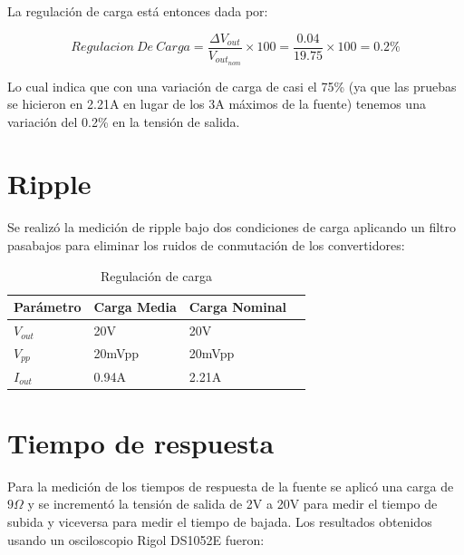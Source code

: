 \documentclass[12pt]{report}
\begin{document}
La regulación de carga está entonces dada por:

\begin{equation}
	Regulacion \ De \ Carga = \frac{\Delta V_{out}}{V_{out_{nom}}} \times 100 = \frac{0.04}{19.75} \times 100 = 0.2\%
\end{equation}

Lo cual indica que con una variación de carga de casi el 75\% (ya que las pruebas se hicieron en 2.21A en lugar de los 3A máximos de la fuente) tenemos una variación del 0.2\% en la tensión de salida.

\section{Ripple}

Se realizó la medición de ripple bajo dos condiciones de carga aplicando un filtro pasabajos para eliminar los ruidos de conmutación de los convertidores:

\begin{table}[H]
	\centering
	\begin{tabular}{M{2cm}M{3cm}M{3cm}M{3cm}} \toprule
		Parámetro & Carga Media & Carga Nominal \\
		\midrule
		$V_{out}$ & 20V & 20V \\
		$V_{pp}$ & 20mVpp & 20mVpp \\
		$I_{out}$ & 0.94A & 2.21A \\
		\bottomrule
	\end{tabular}
	\caption{Regulación de carga}
\end{table}

\section{Tiempo de respuesta}

Para la medición de los tiempos de respuesta de la fuente se aplicó una carga de $9\Omega$ y se incrementó la tensión de salida de 2V a 20V para medir el tiempo de subida y viceversa para medir el tiempo de bajada. Los resultados obtenidos usando un osciloscopio Rigol DS1052E fueron:
\end{document}

